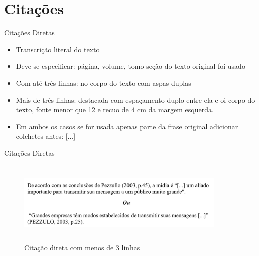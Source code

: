 \section{Citações}

\begin{frame}	
	\begin{block}{Citações Diretas}	
		\begin{itemize}
			\item Transcrição literal do texto
			\item Deve-se especificar: página, volume, tomo seção do texto original foi usado
			\item Com até três linhas: no corpo do texto com aspas duplas
			\item Mais de três linhas: destacada com espaçamento duplo entre ela e oi corpo do texto, fonte menor que 12 e recuo de 4 cm da margem esquerda.
			\item Em ambos os casos se for usada apenas parte da frase original adicionar colchetes antes: [...]
		\end{itemize}
	\end{block}
\end{frame}

\begin{frame}	
	\begin{block}{Citações Diretas}	
		 \begin{figure}[!htb]
			\centering	  				
			\includegraphics[height=4cm, width = 10cm]{./pic/diretamenos3linhas.png}
			\caption{Citação direta com menos de 3 linhas}
			\author{Guia de formatação SENAC }
			\label{fig_citacaodiretamenos3linhas}
		\end{figure}
	\end{block}
\end{frame}

